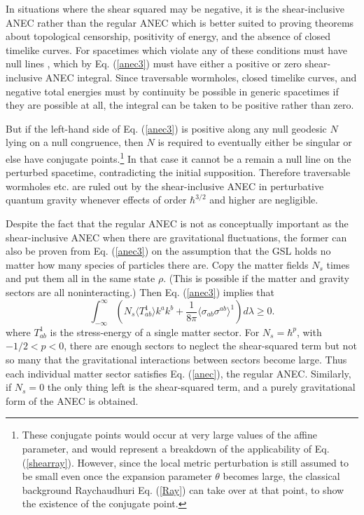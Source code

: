 \documentclass[11pt]{article}
\begin{document}
In situations where the shear squared may be negative, it is the shear-inclusive ANEC rather than the regular ANEC which is better suited to proving theorems about topological censorship, positivity of energy, and the absence of closed timelike curves.  For spacetimes which violate any of these conditions must have null lines \cite{GO07}\cite{PSW93}, which by Eq. (\ref{anec3}) must have either a positive or zero shear-inclusive ANEC integral.  Since traversable wormholes, closed timelike curves, and negative total energies must by continuity be possible in generic spacetimes if they are possible at all, the integral can be taken to be positive rather than zero.

But if the left-hand side of Eq. (\ref{anec3}) is positive along any null geodesic $N$ lying on a null congruence, then $N$ is required to eventually either be singular or else have conjugate points.\footnote{These conjugate points would occur at very large values of the affine parameter, and would represent a breakdown of the applicability of Eq. (\ref{shearray}).  However, since the local metric perturbation is still assumed to be small even once the expansion parameter $\theta$ becomes large, the classical background Raychaudhuri Eq. (\ref{Ray}) can take over at that point, to show the existence of the conjugate point.}  In that case it cannot be a remain a null line on the perturbed spacetime, contradicting the initial supposition.  Therefore traversable wormholes etc. are ruled out by the shear-inclusive ANEC in perturbative quantum gravity whenever effects of order $\hbar^{3/2}$ and higher are negligible.

Despite the fact that the regular ANEC is not as conceptually important as the shear-inclusive ANEC when there are gravitational fluctuations, the former can also be proven from Eq. (\ref{anec3}) on the assumption that the GSL holds no matter how many species of particles there are.  Copy the matter fields $N_s$ times and put them all in the same state $\rho$.  (This is possible if the matter and gravity sectors are all noninteracting.)  Then Eq. (\ref{anec3}) implies that 
\begin{equation}
\int^{\infty}_{-\infty} (N_s \langle T_{ab}^{1} \rangle k^a k^b + 
\frac{1}{8\pi} \langle \sigma_{ab}\sigma^{ab} \rangle^{1}) d\lambda \ge 0.
\end{equation}
where $T_{ab}^{1}$ is the stress-energy of a single matter sector.  For $N_s = \hbar^{p}$, with $-1/2 < p < 0$, there are enough sectors to neglect the shear-squared term but not so many that the gravitational interactions between sectors become large.  Thus each individual matter sector satisfies Eq. (\ref{anec}), the regular ANEC.  Similarly, if $N_s = 0$ the only thing left is the shear-squared term, and a purely gravitational form of the ANEC is obtained.
\end{document}
